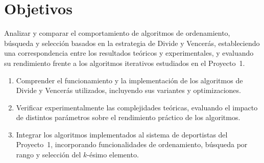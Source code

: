 \section{Objetivos}\label{sec:objetivos}
Analizar y comparar el comportamiento de algoritmos de ordenamiento, búsqueda y selección basados en la estrategia de Divide y Vencerás, estableciendo una correspondencia entre los resultados teóricos y experimentales, y evaluando su rendimiento frente a los algoritmos iterativos estudiados en el Proyecto~1.

\begin{enumerate}
    \item Comprender el funcionamiento y la implementación de los algoritmos de Divide y Vencerás utilizados, incluyendo sus variantes y optimizaciones.
    \item Verificar experimentalmente las complejidades teóricas, evaluando el impacto de distintos parámetros sobre el rendimiento práctico de los algoritmos.
    \item Integrar los algoritmos implementados al sistema de deportistas del Proyecto~1, incorporando funcionalidades de ordenamiento, búsqueda por rango y selección del $k$-ésimo elemento.
\end{enumerate}